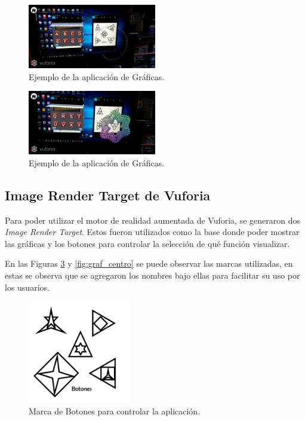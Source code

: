 \begin{figure}[hbt!]
\centering
\includegraphics[width=0.5\textwidth]{figuras/graficas/ej2.png}
\caption{\label{fig:graf_ej2}Ejemplo de la aplicación de Gráficas.}
\end{figure}

\begin{figure}[hbt!]
\centering
\includegraphics[width=0.5\textwidth]{figuras/graficas/ej3.png}
\caption{\label{fig:graf_ej3}Ejemplo de la aplicación de Gráficas.}
\end{figure}
\FloatBarrier

\subsection{Image Render Target de Vuforia}
Para poder utilizar el motor de realidad aumentada de Vuforia, se generaron dos \textit{Image Render Target}. Estos fueron utilizados como la base donde poder mostrar las gráficas y los botones para controlar la selección de qué función visualizar.

En las Figuras \ref{fig:graf_botones} y \ref{fig:graf_centro} se puede observar las marcas utilizadas, en estas se observa que se agregaron los nombres bajo ellas para facilitar su uso por los usuarios.

\begin{figure}[hbt!]
\centering
\includegraphics[width=0.4\textwidth]{figuras/graficas/botones.png}
\caption{\label{fig:graf_botones}Marca de Botones para controlar la aplicación.}
\end{figure}

